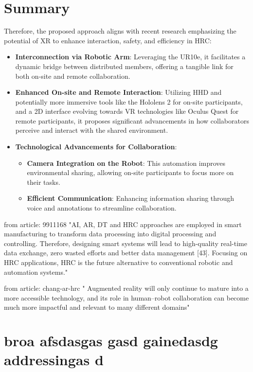 \section{Summary}
Therefore, the proposed approach aligns with recent research emphasizing the potential of \ac{XR} to enhance interaction, safety, and efficiency 
in \ac{HRC}:
\begin{itemize}
    \item \textbf{Interconnection via Robotic Arm}: Leveraging the UR10e, it facilitates a dynamic bridge between distributed members, offering a 
    tangible link for both on-site and remote collaboration.

    \item \textbf{Enhanced On-site and Remote Interaction}: Utilizing \ac{HHD} and potentially more immersive tools like the Hololens 2 for on-site 
    participants, and a 2D interface evolving towards \ac{VR} technologies like Oculus Quest for remote participants, it proposes significant advancements 
    in how collaborators perceive and interact with the shared environment.

    \item \textbf{Technological Advancements for Collaboration}:
    \begin{itemize}
        \item \textbf{Camera Integration on the Robot}: This automation improves environmental sharing, allowing on-site participants to focus more 
        on their tasks. 
        \item \textbf{Efficient Communication}: Enhancing information sharing through voice and annotations to streamline collaboration.
    \end{itemize}
\end{itemize}


from article: 9911168
"AI, AR, DT and HRC approaches are employed in smart manufacturing to transform data processing into digital processing and controlling. 
Therefore, designing smart systems will lead to high-quality real-time data exchange, zero wasted efforts and better data management [43]. 
Focusing on HRC applications, HRC is the future alternative to conventional robotic and automation systems."

from article: chang-ar-hrc
" Augmented reality will only continue to mature into
a more accessible technology, and its role in human–robot collaboration can become much
more impactful and relevant to many different domains"


\section{broa
afsdasgas
gasd
gainedasdg
addressingas
d}





